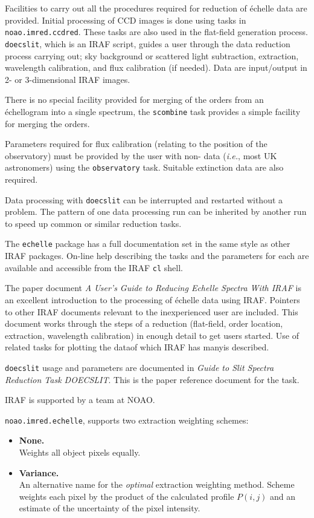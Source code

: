 Facilities to carry out all the procedures required for reduction of
\'{e}chelle data are provided.  Initial processing of CCD images is done
using tasks in {\tt noao.imred.ccdred}\@.  These tasks are also used in the
flat-field generation process.  {\tt doecslit}, which is an IRAF script,
guides a user through the data reduction process carrying out; sky
background or scattered light subtraction, extraction, wavelength
calibration, and flux calibration (if needed).  Data are input/output in
2- or 3-dimensional IRAF images.

There is no special facility provided for merging of the orders from an
\'{e}chellogram into a single spectrum, the {\tt scombine} task provides
a simple facility for merging the orders.

Parameters required for flux calibration (relating to the position of the
observatory) must be provided by the user with
non- data ({\em{i.e.}},
most UK astronomers) using the {\tt observatory} task.
Suitable extinction data are also required.

Data processing with {\tt doecslit} can be interrupted and restarted
without a problem.  The pattern of one data processing run can be inherited
by another run to speed up common or similar reduction tasks.

The {\tt echelle} package has a full documentation set in the same style as
other IRAF packages.  On-line help describing the tasks and the parameters
for each are available and accessible from the IRAF {\tt cl} shell.

The paper document {\sl A User's Guide to Reducing Echelle Spectra With
IRAF} is an excellent introduction to the processing of \'{e}chelle data
using IRAF\@.  Pointers to other IRAF documents relevant to the inexperienced
user are included.  This document works through the steps of a reduction
(flat-field, order location, extraction, wavelength calibration) in enough
detail to get users started. Use of related tasks for plotting the
data\sgspec{---}{ - }of which IRAF has many\sgspec{---}{ - }is described.

{\tt doecslit} usage and parameters are documented in {\sl Guide to Slit
Spectra Reduction Task DOECSLIT}\@.  This is the paper reference document
for the task.

IRAF is supported by a team at NOAO\@.

{\tt noao.imred.echelle}, supports two extraction weighting schemes:

\begin{itemize}

\item {\bf{None.}} \mbox{}\\
      Weights all object pixels equally.

\item {\bf{Variance.}} \mbox{}\\
      An alternative name for the {\em optimal} extraction weighting
      method.
      Scheme weights each pixel by the product of the calculated profile
      $P(i,j)$ and an estimate of the uncertainty of the pixel intensity.

\end{itemize}

